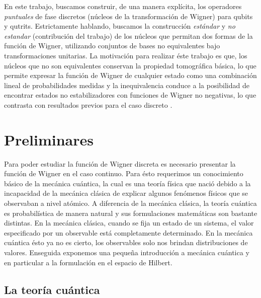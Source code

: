 \documentclass[a4paper]{report}
\begin{document}
  En este trabajo, buscamos construir, de una manera
  explícita, los operadores \textit{puntuales} de fase
  discretos (núcleos de la transformación de Wigner) para
  qubits y qutrits. Estrictamente hablando, buscamos la
  construcción \textit{estándar}
  \cite{woottersWignerFunctionFormulationFiniteState1987} y
  \textit{no estandar} (contribución del trabajo) de los
  núcleos que permitan dos formas de la función de Wigner,
  utilizando conjuntos de bases no equivalentes bajo
  transformaciones unitarias. La motivación para realizar
  éste trabajo es que, los núcleos que no son equivalentes
  conservan la propiedad tomográfica básica, lo que permite
  expresar la función de Wigner de cualquier estado como una
  combinación lineal de probabilidades medidas y la
  inequivalencia conduce a la posibilidad de encontrar
  estados no estabilizadores con funciones de Wigner no
  negativas, lo que contrasta con resultados previos para el
  caso discreto
  \cite{grossHudsonTheoremFinitedimensional2006,
  galvaoDiscreteWignerFunctions2005,
  cormickInterferenceDiscreteWigner2006}.

  \chapter{Preliminares}

  Para poder estudiar la función de Wigner discreta es
  necesario presentar la función de Wigner en el caso
  continuo. Para ésto requerimos un conocimiento básico de
  la mecánica cuántica, la cual es una teoría física que
  nació debido a la incapacidad de la mecánica clásica de
  explicar algunos fenómenos físicos que se observaban a
  nivel atómico. A diferencia de la mecánica clásica, la
  teoría cuántica es probabilística de manera natural y sus
  formulaciones matemáticas son bastante distintas. En la
  mecánica clásica, cuando se fija un estado de un sistema,
  el valor especificado por un observable está completamente
  determinado. En la mecánica cuántica ésto ya no es cierto,
  los observables solo nos brindan distribuciones de
  valores.  Enseguida exponemos una pequeña introducción a
  mecánica cuántica y en particular a la formulación en el
  espacio de Hilbert.

  \section{La teoría cuántica}
\end{document}
